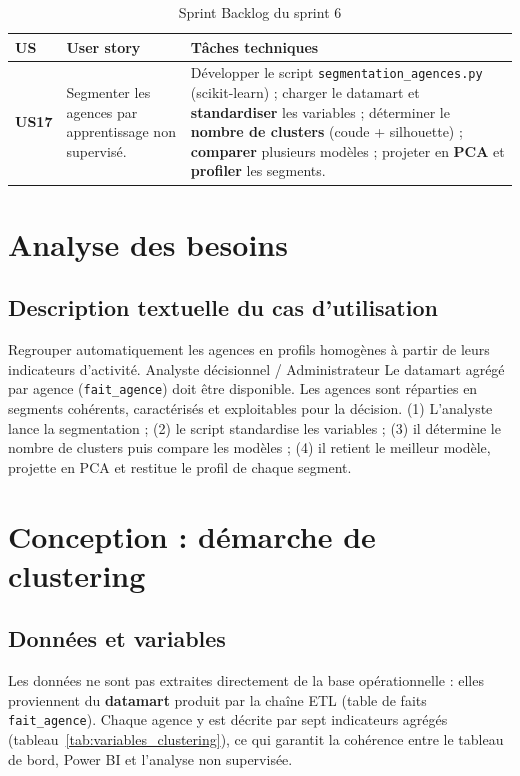 \begin{table}[htbp]
\centering
\caption{Sprint Backlog du sprint 6}
\label{tab:bl_s6}
\renewcommand{\arraystretch}{1.3}
\begin{tabularx}{\textwidth}{>{\bfseries}p{1cm}p{4.4cm}X}
\toprule
\textmd{\textbf{US}} & \textbf{User story} & \textbf{Tâches techniques}\\
\midrule
US17 & Segmenter les agences par apprentissage non supervisé. &
Développer le script \texttt{segmentation\_agences.py} (scikit-learn) ; charger le
datamart et \textbf{standardiser} les variables ; déterminer le \textbf{nombre de
clusters} (coude + silhouette) ; \textbf{comparer} plusieurs modèles ; projeter en
\textbf{PCA} et \textbf{profiler} les segments.\\
\bottomrule
\end{tabularx}
\end{table}

\section{Analyse des besoins}

\subsection{Description textuelle du cas d'utilisation}

{Regrouper automatiquement les agences en profils homogènes à partir de leurs
indicateurs d'activité.}
{Analyste décisionnel / Administrateur}
{Le datamart agrégé par agence (\texttt{fait\_agence}) doit être disponible.}
{Les agences sont réparties en segments cohérents, caractérisés et exploitables
pour la décision.}
{(1) L'analyste lance la segmentation ; (2) le script standardise les variables ;
(3) il détermine le nombre de clusters puis compare les modèles ; (4) il retient
le meilleur modèle, projette en PCA et restitue le profil de chaque segment.}

\section{Conception : démarche de clustering}

\subsection{Données et variables}
Les données ne sont pas extraites directement de la base opérationnelle : elles
proviennent du \textbf{datamart} produit par la chaîne ETL (table de faits
\texttt{fait\_agence}). Chaque agence y est décrite par sept indicateurs agrégés
(tableau~\ref{tab:variables_clustering}), ce qui garantit la cohérence entre le
tableau de bord, Power BI et l'analyse non supervisée.

